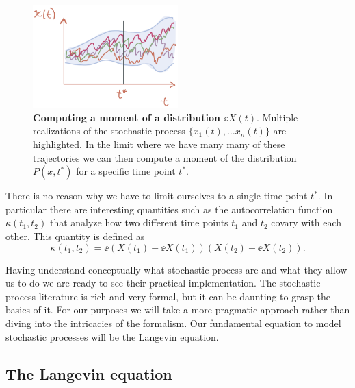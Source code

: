 \begin{figure}[h!]
	\centering \includegraphics[width=0.5\textwidth]
  {../fig/drift_langevin/01_00002.jpeg}
	\caption{\textbf{Computing a moment of a distribution $\ee{X(t)}$}. Multiple
  realizations of the stochastic process $\{x_1(t), \ldots x_n(t)\}$ are
  highlighted. In the limit where we have many many of these trajectories we
  can then compute a moment of the distribution $P(x, t^*)$ for a specific time
  point $t^*$. }
  \label{fig01_00002}
\end{figure}

There is no reason why we have to limit ourselves to a single time point $t^*$.
In particular there are interesting quantities such as the autocorrelation
function $\kappa(t_1, t_2)$ that analyze how two different time points $t_1$
and $t_2$ covary with each other. This quantity is defined as
\begin{equation}
  \kappa(t_1, t_2) = \ee{\left(X(t_1) - \ee{X(t_1)}\right)
                         \left(X(t_2) - \ee{X(t_2)}\right)}.
\end{equation}

Having understand conceptually what stochastic process are and what they allow
us to do we are ready to see their practical implementation. The stochastic
process literature is rich and very formal, but it can be daunting to grasp the
basics of it. For our purposes we will take a more pragmatic approach rather
than diving into the intricacies of the formalism. Our fundamental equation to
model stochastic processes will be the Langevin equation.

\subsection{The Langevin equation}

